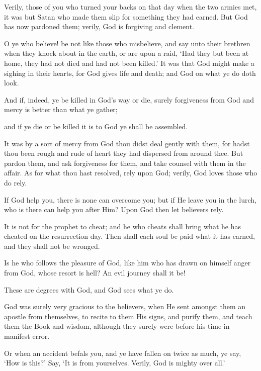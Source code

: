 \documentclass[fontsize=14pt, letterpaper, notitlepage, openany, DIV=12]{scrbook} %
\begin{document}
\noindent[3:155]
Verily, those of you who turned your backs on that day when the two armies met, it was
but Satan who made them slip for something they had earned. But God has now pardoned them;
verily, God is forgiving and clement.

\noindent[3:156]
O ye who believe! be not like those who misbelieve, and say unto their brethren when
they knock about in the earth, or are upon a raid, `Had they but been at home, they had not died
and had not been killed.' It was that God might make a sighing in their hearts, for God gives life
and death; and God on what ye do doth look.

\noindent[3:157]
And if, indeed, ye be killed in God's way or die, surely forgiveness from God and mercy
is better than what ye gather;

\noindent[3:158]
and if ye die or be killed it is to God ye shall be assembled.

\noindent[3:159]
It was by a sort of mercy from God thou didst deal gently with them, for hadst thou been
rough and rude of heart they had dispersed from around thee. But pardon them, and ask
forgiveness for them, and take counsel with them in the affair. As for what thou hast resolved,
rely upon God; verily, God loves those who do rely.

\noindent[3:160]
If God help you, there is none can overcome you; but if He leave you in the lurch, who is
there can help you after Him? Upon God then let believers rely.

\noindent[3:161]
It is not for the prophet to cheat; and he who cheats shall bring what he has cheated on
the resurrection day. Then shall each soul be paid what it has earned, and they shall not be
wronged.

\noindent[3:162]
Is he who follows the pleasure of God, like him who has drawn on himself anger from
God, whose resort is hell? An evil journey shall it be!

\noindent[3:163]
These are degrees with God, and God sees what ye do.

\noindent[3:164]
God was surely very gracious to the believers, when He sent amongst them an apostle
from themselves, to recite to them His signs, and purify them, and teach them the Book and
wisdom, although they surely were before his time in manifest error.

\noindent[3:165]
Or when an accident befals you, and ye have fallen on twice as much, ye say, `How is
this?' Say, `It is from yourselves. Verily, God is mighty over all.'
\end{document}
